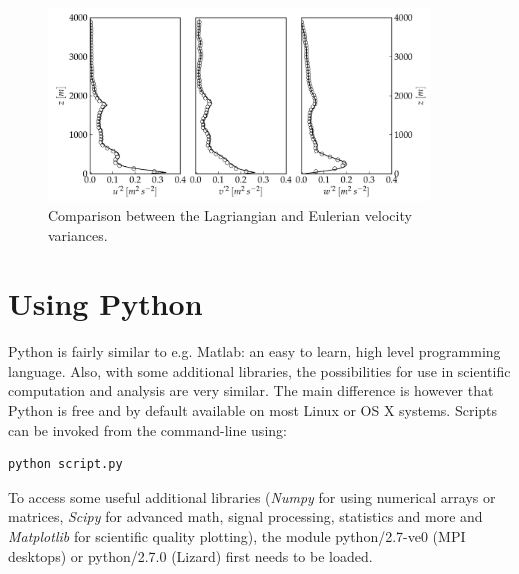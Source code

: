 \documentclass[twoside,a4paper]{report}
\begin{document}
\begin{figure}[h]
  \begin{center}
    \includegraphics[width=0.9\textwidth]{figures_LPTM/rico_variances.pdf}
    \caption{Comparison between the Lagriangian and Eulerian velocity variances.}
    \label{fig:exa_variances}       %
  \end{center}
\end{figure}

\appendix
\chapter{Using Python}
\label{app:python}

Python is fairly similar to e.g. Matlab: an easy to learn, high level programming language. Also, with some additional libraries, the possibilities for use in scientific computation and analysis are very similar. The main difference is however that Python is free and by default available on most Linux or OS X systems. Scripts can be invoked from the command-line using:

\begin{verbatim}
python script.py
\end{verbatim}

To access some useful additional libraries (\textit{Numpy} for using numerical arrays or matrices, \textit{Scipy} for advanced math, signal processing, statistics and more and \textit{Matplotlib} for scientific quality plotting), the module python/2.7-ve0 (MPI desktops) or python/2.7.0 (Lizard) first needs to be loaded.\newline
\end{document}
